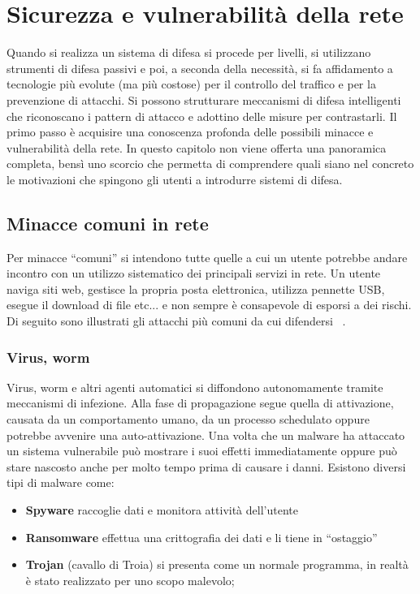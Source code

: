\section{Sicurezza e vulnerabilità della rete}

Quando si realizza un sistema di difesa si procede per livelli, si utilizzano strumenti di difesa passivi e poi, a seconda della necessità, si fa affidamento a tecnologie più evolute (ma più costose) per il controllo del traffico e per la prevenzione di attacchi. Si possono strutturare meccanismi di difesa intelligenti che riconoscano i pattern di attacco e adottino delle misure per contrastarli. Il primo passo è acquisire una conoscenza profonda delle possibili minacce e vulnerabilità della rete. In questo capitolo non viene offerta una panoramica completa, bensì uno scorcio che permetta di comprendere quali siano nel concreto le motivazioni che spingono gli utenti a introdurre sistemi di difesa.

\subsection{Minacce comuni in rete}

Per minacce ``comuni'' si intendono tutte quelle a cui un utente potrebbe andare incontro con un utilizzo sistematico dei principali servizi in rete. Un utente naviga siti web, gestisce la propria posta elettronica, utilizza pennette USB, esegue il download di file etc... e non sempre è consapevole di esporsi a dei rischi.
Di seguito sono illustrati gli attacchi più comuni da cui difendersi ~\cite{softwarelab}.

\subsubsection{Virus, worm}

Virus, worm e altri agenti automatici si diffondono autonomamente tramite meccanismi di infezione. Alla fase di propagazione segue quella di attivazione, causata da un comportamento umano, da un processo schedulato oppure potrebbe avvenire una auto-attivazione. Una volta che un malware ha attaccato un sistema vulnerabile può mostrare i suoi effetti immediatamente oppure può stare nascosto anche per molto tempo prima di causare i danni.
Esistono diversi tipi di malware come:
\begin{itemize}
    \item \textbf{Spyware} raccoglie dati e monitora attività dell'utente
    \item \textbf{Ransomware} effettua una crittografia dei dati e li tiene in ``ostaggio''
    \item  \textbf{Trojan}  (cavallo di Troia) si presenta come un normale programma, in realtà è stato realizzato per uno scopo malevolo;
\end{itemize}

